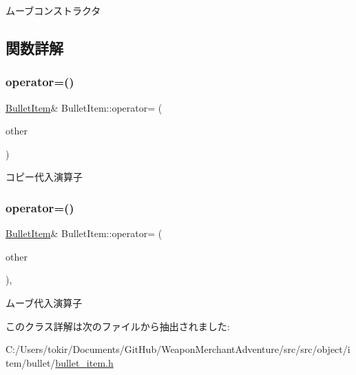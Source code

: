 ムーブコンストラクタ 



\subsection{関数詳解}
\mbox{\label{class_bullet_item_a0c2c6828c04646479a12dae566b41cfb}} 
\subsubsection{\texorpdfstring{operator=()}{operator=()}\hspace{0.1cm}{\footnotesize\ttfamily [1/2]}}
{\footnotesize\ttfamily \mbox{\hyperlink{class_bullet_item}{Bullet\+Item}}\& Bullet\+Item\+::operator= (\begin{DoxyParamCaption}\item[{const \mbox{\hyperlink{class_bullet_item}{Bullet\+Item}} \&}]{other }\end{DoxyParamCaption})\hspace{0.3cm}{\ttfamily [inline]}}



コピー代入演算子 

\mbox{\label{class_bullet_item_aa494421c7189fd60911db51628c63455}} 
\subsubsection{\texorpdfstring{operator=()}{operator=()}\hspace{0.1cm}{\footnotesize\ttfamily [2/2]}}
{\footnotesize\ttfamily \mbox{\hyperlink{class_bullet_item}{Bullet\+Item}}\& Bullet\+Item\+::operator= (\begin{DoxyParamCaption}\item[{\mbox{\hyperlink{class_bullet_item}{Bullet\+Item}} \&\&}]{other }\end{DoxyParamCaption})\hspace{0.3cm}{\ttfamily [inline]}, {\ttfamily [noexcept]}}



ムーブ代入演算子 



このクラス詳解は次のファイルから抽出されました\+:\begin{DoxyCompactItemize}
\item 
C\+:/\+Users/tokir/\+Documents/\+Git\+Hub/\+Weapon\+Merchant\+Adventure/src/src/object/item/bullet/\mbox{\hyperlink{bullet__item_8h}{bullet\+\_\+item.\+h}}\end{DoxyCompactItemize}
